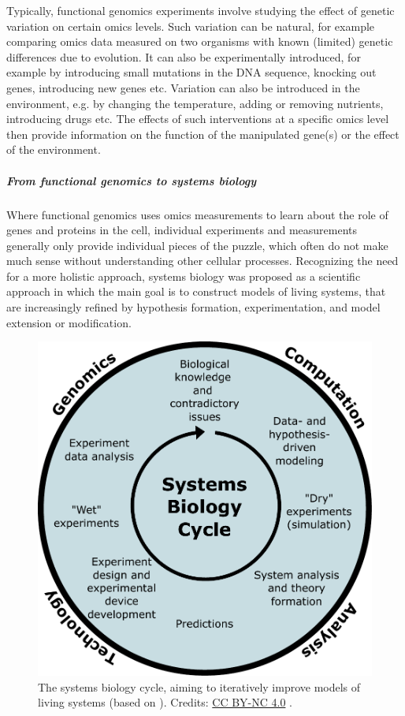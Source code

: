 Typically, functional genomics experiments involve studying the effect of
genetic variation on certain omics levels.  Such variation can be natural,
for example comparing omics data measured on two organisms with known
(limited) genetic differences due to evolution.  It can also be
experimentally introduced, for example by introducing small mutations in the
DNA sequence, knocking out genes, introducing new genes etc.  Variation can
also be introduced in the environment, e.g. by changing the
temperature, adding or removing nutrients, introducing drugs etc. The effects of
such interventions at a specific omics level then provide information on the
function of the manipulated gene(s) or the effect of the environment.


\subparagraph{From functional genomics to systems biology}

Where functional genomics uses omics measurements to learn about the role
of genes and proteins in the cell, individual experiments and measurements
generally only provide individual pieces of the puzzle, which often do not
make much sense without understanding other cellular processes. Recognizing
the need for a more holistic approach, systems biology was proposed as a
scientific approach in which the main goal is to construct models of living
systems, that are increasingly refined by hypothesis formation,
experimentation, and model extension or modification.

\begin{figure}[!htbp]
\centering
\includegraphics[width=0.5\linewidth]{files/systems-biology_alt-1ec51eb64581d8097f689b71d4f29d6e.pdf}
\caption[]{The systems biology cycle, aiming to iteratively improve models of living systems
(based on \cite{systems_biology_2002}).
Credits: \href{https://creativecommons.org/licenses/by/4.0/}{CC BY-NC 4.0} \cite{own_5_2024}.}
\label{systems_biology_alt}
\end{figure}

